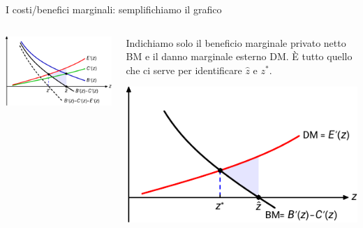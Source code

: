 \documentclass[aspectratio=64,12pt]{beamer}
\begin{document}
\begin{frame}{I costi/benefici marginali: semplifichiamo il grafico}
\begin{columns}
\begin{column}[b]{.5\columnwidth}
\begin{center}
\includegraphics[width=\textwidth]{./figure/esternalita-2-color.pdf}
\end{center}

\vfill

\hfill
{}
\end{column}

\begin{column}[b]{.5\columnwidth}
Indichiamo solo il beneficio marginale privato netto BM e il danno marginale esterno DM. È tutto quello che ci serve per identificare $\hat{z}$ e $z^*$.
\vfill

\begin{center}
\includegraphics[width=\textwidth]{./figure/esternalita-3-color.pdf}
\end{center}
\end{column}
\end{columns}
\end{frame}
\end{document}
